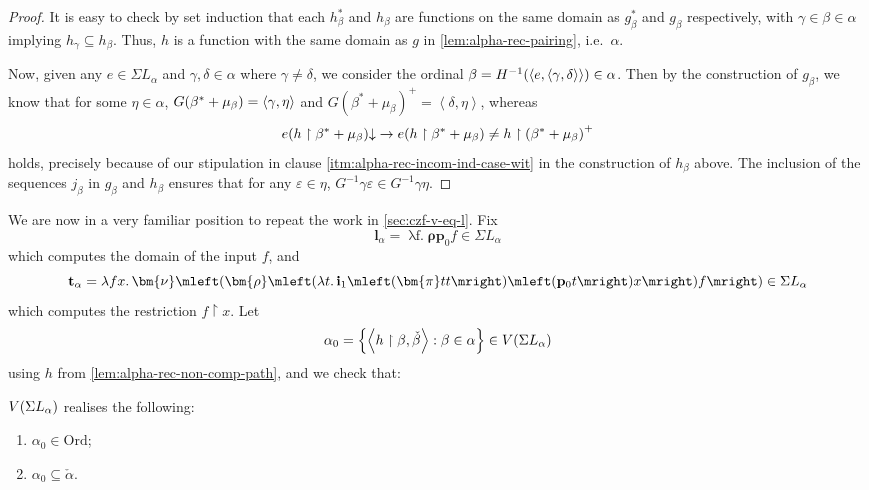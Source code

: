 \documentclass[12pt,openany]{book}
\theoremstyle{plain}
\theoremstyle{definition}
\newcommand\uplabel[1]{\textup{(#1)}}
\newcommand\tuple[1]{\left\langle #1 \right\rangle}
\newcommand\oplam[1]{\mathop{\lambda #1.}}
\newcommand\Ord{\mathrm{Ord}}
\newcommand\bp{\mathbf{p}}
\newcommand\bi{\mathbf{i}}
\newcommand\bl{\mathbf{l}}
\newcommand\bt{\mathbf{t}}
\begin{document}
\begin{proof}
  It is easy to check by set induction that each $h^*_\beta$ and $h_\beta$ are functions on the same domain as $g^*_\beta$ and $g_\beta$ respectively, with $\gamma \in \beta \in \alpha$ implying $h_\gamma \subseteq h_\beta$. Thus, $h$ is a function with the same domain as $g$ in \autoref{lem:alpha-rec-pairing}, i.e.\ $\alpha$.

  Now, given any $e \in \Sigma L_\alpha$ and $\gamma, \delta \in \alpha$ where $\gamma \neq \delta$, we consider the ordinal $\beta = H^{-1}\mleft(\tuple{e, \tuple{\gamma, \delta}}\mright) \in \alpha$. Then by the construction of $g_\beta$, we know that for some $\eta \in \alpha$, $G \mleft(\beta^* + \mu_\beta\mright) = \tuple{\gamma, \eta}$ and $G {\left(\beta^* + \mu_\beta\right)^+} = \tuple{\delta, \eta}$, whereas
  \[e \mleft(h \upharpoonright \beta^* + \mu_\beta\mright) {\downarrow} \rightarrow e \mleft(h \upharpoonright \beta^* + \mu_\beta\mright) \neq h \upharpoonright \left(\beta^* + \mu_\beta\right)^+\]
  holds, precisely because of our stipulation in clause \ref{itm:alpha-rec-incom-ind-case-wit} in the construction of $h_\beta$ above. The inclusion of the sequences $j_\beta$ in $g_\beta$ and $h_\beta$ ensures that for any $\varepsilon \in \eta$, $G^{-1} \gamma \varepsilon \in G^{-1} \gamma \eta$.
\end{proof}

We are now in a very familiar position to repeat the work in \autoref{sec:czf-v-eq-l}. Fix
\[\bl_\alpha = \oplam{f} \bm{\rho} \bp_0 f \in \Sigma L_\alpha\]
which computes the domain of the input $f$, and
\[\bt_\alpha = \oplam{fx} \bm{\nu} \mleft(\bm{\rho} \mleft(\oplam{t} \bi_1 \mleft(\bm{\pi} tt\mright) \mleft(\bp_0 t\mright) x\mright) f\mright) \in \Sigma L_\alpha\]
which computes the restriction $f \upharpoonright x$. Let
\[\alpha_0 = \left\{\tuple{h \upharpoonright \beta, \check{\beta}} : \beta \in \alpha\right\} \in V\mleft(\Sigma L_\alpha\mright)\]
using $h$ from \autoref{lem:alpha-rec-non-comp-path}, and we check that:
\begin{lemma}
  $V\mleft(\Sigma L_\alpha\mright)$ realises the following:
  \begin{enumerate}[label=\uplabel{\roman*}]
    \item \label{itm:alpha-rec-incom-ord-basic-ord} $\alpha_0 \in \Ord$;
    \item $\alpha_0 \subseteq \check{\alpha}$.
  \end{enumerate}
\end{lemma}
\end{document}
